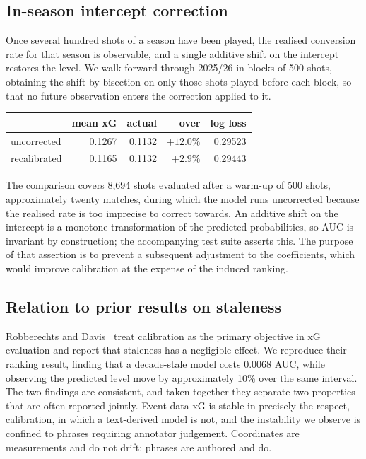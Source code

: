 \documentclass[conference]{IEEEtran}
\newcommand{\num}[1]{\mbox{#1}}
\begin{document}
\subsection{In-season intercept correction}

Once several hundred shots of a season have been played, the realised
conversion rate for that season is observable, and a single additive shift on
the intercept restores the level. We walk forward through 2025/26 in blocks of
500 shots, obtaining the shift by bisection on only those shots played before
each block, so that no future observation enters the correction applied to it.

\begin{center}
\begin{tabular}{lrrrr}
\toprule
& mean xG & actual & over & log loss \\
\midrule
uncorrected  & \num{0.1267} & \num{0.1132} & $+12.0\%$ & \num{0.29523} \\
recalibrated & \num{0.1165} & \num{0.1132} & $+2.9\%$  & \num{0.29443} \\
\bottomrule
\end{tabular}
\end{center}

The comparison covers \num{8,694} shots evaluated after a warm-up of 500
shots, approximately twenty matches, during which the model runs uncorrected
because the realised rate is too imprecise to correct towards. An additive
shift on the intercept is a monotone transformation of the predicted
probabilities, so AUC is invariant by construction; the accompanying test suite
asserts this. The purpose of that assertion is to prevent a subsequent
adjustment to the coefficients, which would improve calibration at the expense
of the induced ranking.

\subsection{Relation to prior results on staleness}

Robberechts and Davis~\cite{robberechts2020data} treat calibration as the
primary objective in xG evaluation and report that staleness has a negligible
effect. We reproduce their ranking result, finding that a decade-stale model
costs \num{0.0068} AUC, while observing the predicted level move by
approximately 10\% over the same interval. The two findings are consistent, and
taken together they separate two properties that are often reported jointly.
Event-data xG is stable in precisely the respect, calibration, in which a
text-derived model is not, and the instability we observe is confined to
phrases requiring annotator judgement. Coordinates are measurements and do not
drift; phrases are authored and do.
\end{document}
